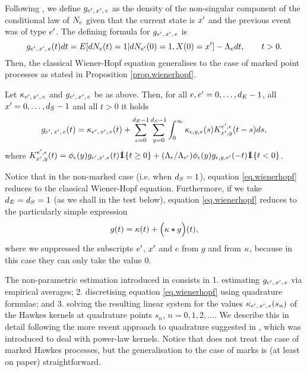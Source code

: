 \documentclass[10pt, article,table]{article}
\begin{document}
Following \citealp{BM16fir}, we define $g\subscriptexe$ as the density of the non-singular component of the conditional law of $\countingProc$ given that the current state is $\xone$ and the previous event was of type $\eone$. The defining formula for $g\subscriptexe$ is 
\begin{equation*}
 g\subscriptexe(t)dt = \Expectation[d\countingProc[e](t)=1 \vert d\countingProc[\eone](0)=1, \stateVariable(0)=\xone] - \Lambda_e dt, \qquad t>0.
\end{equation*}
Then, the classical Wiener-Hopf equation generalises to the case of marked point processes as stated in Proposition \ref{prop.wienerhopf}.
\begin{prop}\label{prop.wienerhopf}
 Let $\hawkesKernel\subscriptexe$ and $g\subscriptexe$ be as above. Then, for all $e,\eone = 0,\dots,\numEventTypes -1$, all $\xone = 0,\dots,\numStates-1$ and all  $t>0$ it holds
 \begin{equation}\label{eq.wienerhopf}
  g\subscriptexe(t) = \hawkesKernel\subscriptexe(t) 
  +
  \sum_{\epsilon = 0}^{\numEventTypes -1}\sum_{y=0}^{\numStates-1} \int_{0}^{\infty} \hawkesKernel\subscriptepsye (s) \WHconvkernel_{\xone,y}^{\eone,\epsilon}(t-s)ds,
 \end{equation}
where $\WHconvkernel_{\xone,y}^{\eone,\epsilon}(t) = \transProb_{\epsilon}(y) g_{\eone,\xone,\epsilon}(t) \one\lbrace t\geq 0\rbrace + (\Lambda_{\epsilon}/\Lambda_{\eone})\transProb_{\epsilon}(y) g_{\epsilon,y,\eone}(-t)\one\lbrace t<0\rbrace$.
\end{prop}
Notice that in the non-marked case (i.e. when $\numStates = 1$), equation \eqref{eq.wienerhopf} reduces to the classical Wiener-Hopf equation. Furthermore, if we take $\numEventTypes = \numStates = 1$ (as we shall in the test below), equation \eqref{eq.wienerhopf} reduces to the particularly simple expression
\begin{equation}\label{eq.wienerhopf_onedim}
 g(t) = \hawkesKernel(t) + \Big(\hawkesKernel \star g\Big) (t),
\end{equation}
where we suppressed the subscripts $\eone$, $\xone$ and $e$ from $g$ and from $\hawkesKernel$, because in this case they can only take the value $0$.

The non-parametric estimation introduced in \citealp{BM16fir} consists in  1. estimating $g\subscriptexe$ via empirical averages; 2. discretising equation \eqref{eq.wienerhopf} using quadrature formulae;  and 3. solving the resulting linear system for the values $\hawkesKernel\subscriptexe(s_n)$ of the Hawkes kernels at quadrature points $s_n$, $n=0,1,2,\dots$. We describe this in detail following the more recent approach to quadrature suggested in \citealp{BJM16est}, which was introduced to deal with power-law kernels. Notice that \citealp{BJM16est} does not treat the case of marked Hawkes processes, but the generalisation to the case of marks is (at least on paper) straightforward. 
\end{document}
